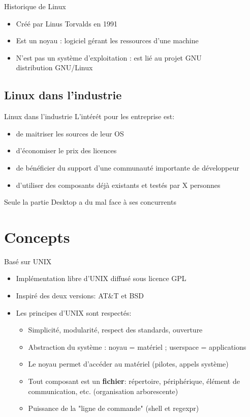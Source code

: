 \begin{frame}{Historique de Linux}{}
  \begin{itemize}
  \item Créé par Linus Torvalds en 1991
  \item Est un noyau : logiciel gérant les ressources d'une machine
  \item N'est pas un système d'exploitation : est lié au projet GNU\\
    \MVRightarrow{} distribution GNU/Linux
  \end{itemize}
\end{frame}

\subsection{Linux dans l'industrie}
\begin{frame}{Linux dans l'industrie}{}
  L'intérét pour les entreprise est:
  \begin{itemize}
  \item de maitriser les sources de leur OS
  \item d'économiser le prix des licences
  \item de bénéficier du support d'une communauté importante de développeur
  \item d'utiliser des composants déjà existants et testés par X personnes
  \end{itemize}
  Seule la partie Desktop a du mal face à ses concurrents
 \end{frame}

\section{Concepts}

\begin{frame}{Basé sur UNIX}{}
  \begin{itemize}
  \item Implémentation libre d'UNIX diffusé sous licence GPL
  \item Inspiré des deux versions: AT\&T et BSD
  \item Les principes d'UNIX sont respectés:
  \begin{itemize}
  \item Simplicité, modularité, respect des standards, ouverture
  \item Abstraction du système : noyau = matériel ; userspace = applications
  \item Le noyau permet d'accéder au matériel (pilotes, appels système)
  \item Tout composant est un \textbf{fichier}: répertoire, périphérique, élément de communication, etc. (organisation arborescente)
  \item Puissance de la "ligne de commande" (shell et regexpr)
  \end{itemize}
  \end{itemize}
\end{frame}

